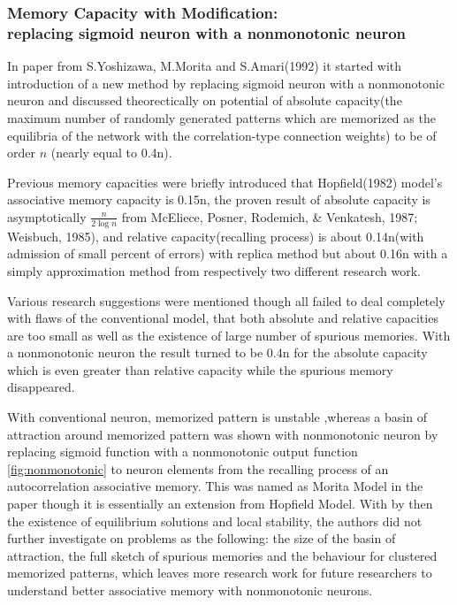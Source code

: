 \documentclass[12pt, a4paper]{article}
\begin{document}
\subsubsection{Memory Capacity with Modification: \\ replacing sigmoid neuron with a nonmonotonic neuron}
In paper from S.Yoshizawa, M.Morita and S.Amari(1992) \cite{capacity_of_nonmonotonic_model} it started with introduction of a new method by replacing sigmoid neuron with a nonmonotonic neuron and discussed theorectically on potential of absolute capacity(the maximum number of randomly generated patterns which are memorized as the equilibria of the network with the correlation-type connection weights) to be of order $n$ (nearly equal to 0.4n).

Previous memory capacities were briefly introduced that Hopfield(1982) model's associative memory capacity is 0.15n, the proven result of absolute capacity is asymptotically $ \frac{n}{2\log{n}} $ from McEliece, Posner, Rodemich, \& Venkatesh, 1987; Weisbuch, 1985), and relative capacity(recalling process) is about 0.14n(with admission of small percent of errors) with replica method but about 0.16n with a simply approximation method from respectively two different research work.

Various research suggestions were mentioned though all failed to deal completely with flaws of the conventional model, that both absolute and relative capacities are too small as well as the existence of large number of spurious memories. With a nonmonotonic neuron the result turned to be 0.4n for the absolute capacity which is even greater than relative capacity while the spurious memory disappeared.

With conventional neuron, memorized pattern is unstable ,whereas a basin of attraction around memorized pattern was shown with nonmonotonic neuron by replacing sigmoid function with a nonmonotonic output function \ref{fig:nonmonotonic} to neuron elements from the recalling process of an autocorrelation associative memory. This was named as Morita Model in the paper though it is essentially an extension from Hopfield Model.
With by then the existence of equilibrium solutions and local stability, the authors did not further investigate on problems as the following: the size of the basin of attraction, the full sketch of spurious memories and the behaviour for clustered memorized patterns, which leaves more research work for future researchers to understand better associative memory with nonmonotonic neurons.
\end{document}
